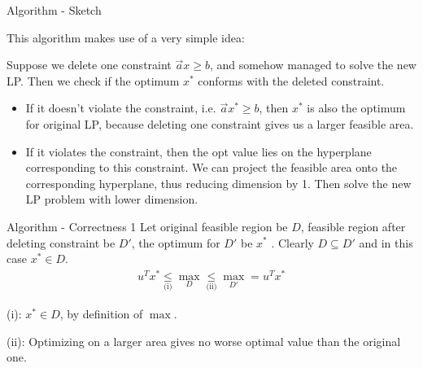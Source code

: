 \documentclass{beamer}
\begin{document}
\begin{frame}{Algorithm - Sketch}

	This algorithm makes use of a very simple idea:

	\vspace{\baselineskip}

	Suppose we delete one constraint $\vec{a} x \ge b$, and somehow managed to solve the new LP.
	Then we check if the optimum $x^*$ conforms with the deleted constraint.

	\vspace{\baselineskip}

	\begin{itemize}
		\item If it doesn't violate the constraint, i.e. $\vec{a} x^* \ge b$, then $x^*$ is also
		      the optimum for original LP, because deleting one constraint
		      gives us a larger feasible area.
		\item If it violates the constraint, then the opt value lies on the hyperplane
		      corresponding to this constraint.  We can project the feasible area
		      onto the corresponding hyperplane, thus reducing dimension by 1. Then
		      solve the new LP problem with lower dimension.
	\end{itemize}
\end{frame}

\begin{frame}{Algorithm - Correctness 1}
	Let original feasible region be $D$, feasible region after deleting constraint be $D'$, the optimum for $D'$ be $x^*$ .
	Clearly $D \subseteq D'$ and in this case $x^* \in D$.
	\begin{align*}
		u^T x^* \underset{\text{(i)}}{\le} \max_{D}  \underset{\text{(ii)}}{\le} \max_{D'} = u^T x^*
	\end{align*}

	(i): $x^* \in D$, by definition of $\max$.

	\vspace{\baselineskip}

	(ii): Optimizing on a larger area gives no worse optimal value than the original one.
\end{frame}
\end{document}
